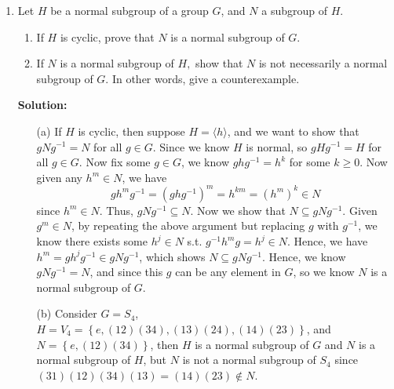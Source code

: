 \documentclass[12pt]{article}
\begin{document}
\begin{enumerate}
    \item Let $H$ be a normal subgroup of a group $G$, and $N$ a subgroup of $H$.
    \begin{enumerate}
        \item If $H$ is cyclic, prove that $N$ is a normal subgroup of $G$.
        \item If $N$ is a normal subgroup of $H,$ show that $N$ is not necessarily a normal subgroup of $G$. In other words, give a counterexample.
    \end{enumerate}
    \textbf{Solution:} 
    \begin{itemize}
        \item [(a)] If \(H\) is cyclic, then suppose \(H = \langle h \rangle \), and we want to show that \(g N g^{-1} = N \) for all \(g \in G\). Since we know \(H\) is normal, so \(g H g^{-1} = H \) for all \(g \in G\). Now fix some \(g \in G\), we know \(ghg^{-1} = h^k \) for some \(k \ge 0\). Now given any \(h^m \in N\), we have 
        \[
            g h^m g^{-1} = \left( ghg^{-1}  \right)^m = h^{km} = \left( h^m \right)^k \in N  
        \] since \(h^m \in N\). Thus, \(g N g^{-1} \subseteq N \). Now we show that \(N \subseteq gNg^{-1} \). Given \(g^m \in N\), by repeating the above argument but replacing \(g\) with \(g^{-1} \), we know there exists some \(h^j \in N\) s.t. \(g^{-1} h^m g = h^j \in N\). Hence, we have \(h^m = g h^j g^{-1} \in g N g^{-1}  \), which shows \(N \subseteq g N g^{-1} \). Hence, we know \(g N g^{-1} = N \), and since this \(g\) can be any element in \(G\), so we know \(N\) is a normal subgroup of \(G\).          
        \item [(b)] Consider \(G = S_4\), \(H = V_4 = \left\{ e, (12)(34), (13)(24), (14)(23) \right\} \), and \(N = \left\{ e, (12)(34) \right\} \), then \(H\) is a normal subgroup of \(G\) and \(N\) is a normal subgroup of \(H\), but \(N\) is not a normal subgroup of \(S_4\) since \((31)(12)(34)(13) = (14)(23) \notin N\).         
    \end{itemize}


\end{enumerate}
\end{document}
